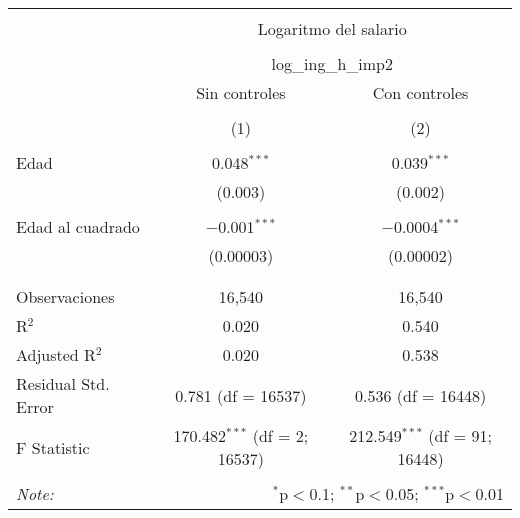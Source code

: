 
\begin{table}[!htbp] \centering 
  \caption{} 
  \label{} 
\begin{tabular}{@{\extracolsep{5pt}}lcc} 
\\[-1.8ex]\hline 
\hline \\[-1.8ex] 
 & \multicolumn{2}{c}{Logaritmo del salario} \\ 
\cline{2-3} 
\\[-1.8ex] & \multicolumn{2}{c}{log\_ing\_h\_imp2} \\ 
 & Sin controles & Con controles \\ 
\\[-1.8ex] & (1) & (2)\\ 
\hline \\[-1.8ex] 
 Edad & 0.048$^{***}$ & 0.039$^{***}$ \\ 
  & (0.003) & (0.002) \\ 
  & & \\ 
 Edad al cuadrado & $-$0.001$^{***}$ & $-$0.0004$^{***}$ \\ 
  & (0.00003) & (0.00002) \\ 
  & & \\ 
\hline \\[-1.8ex] 
Observaciones & 16,540 & 16,540 \\ 
R$^{2}$ & 0.020 & 0.540 \\ 
Adjusted R$^{2}$ & 0.020 & 0.538 \\ 
Residual Std. Error & 0.781 (df = 16537) & 0.536 (df = 16448) \\ 
F Statistic & 170.482$^{***}$ (df = 2; 16537) & 212.549$^{***}$ (df = 91; 16448) \\ 
\hline 
\hline \\[-1.8ex] 
\textit{Note:}  & \multicolumn{2}{r}{$^{*}$p$<$0.1; $^{**}$p$<$0.05; $^{***}$p$<$0.01} \\ 
\end{tabular} 
\end{table} 
